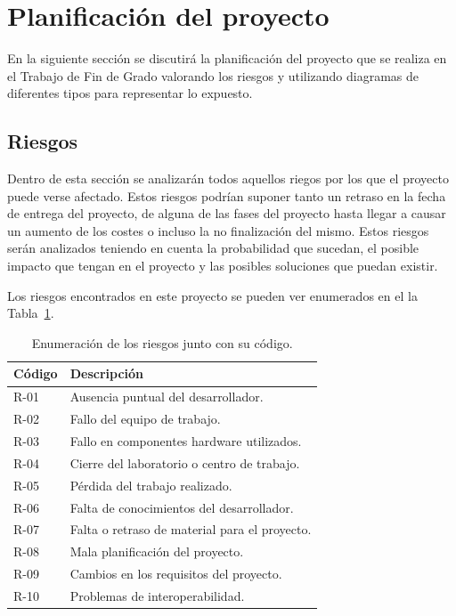 \section{Planificación del proyecto}

En la siguiente sección se discutirá la planificación del proyecto que se realiza en el Trabajo de Fin de Grado valorando los riesgos y utilizando diagramas de diferentes tipos para representar lo expuesto.

\subsection{Riesgos}%
\label{sec:riesgos}

Dentro de esta sección se analizarán  todos aquellos riegos por los que el proyecto puede verse afectado. Estos riesgos podrían suponer tanto un retraso en la fecha de entrega del proyecto, de alguna de las fases del proyecto hasta llegar a causar un aumento de los costes o incluso la no finalización del mismo. Estos riesgos serán analizados teniendo en cuenta la probabilidad que sucedan, el posible impacto que tengan en el proyecto y las posibles soluciones que puedan existir.

Los riesgos encontrados en este proyecto se pueden ver enumerados en el la Tabla~\ref{tabla:riesgos}. 

\begin{table}[htbp]
\begin{center}
\begin{tabular}{|l|l|}
\hline
\textbf{Código} & \textbf{Descripción} \\
\hline \hline
R-01 & Ausencia puntual del desarrollador. \\ \hline
R-02 & Fallo del equipo de trabajo. \\ \hline
R-03 & Fallo en componentes hardware utilizados. \\ \hline
R-04 & Cierre del laboratorio o centro de trabajo. \\ \hline
R-05 & Pérdida del trabajo realizado. \\ \hline
R-06 & Falta de conocimientos del desarrollador. \\ \hline
R-07 & Falta o retraso de material para el proyecto. \\ \hline
R-08 & Mala planificación del proyecto. \\ \hline
R-09 & Cambios en los requisitos del proyecto. \\ \hline
R-10 & Problemas de interoperabilidad. \\ \hline
\end{tabular}
\caption[Riesgos del sistema]{Enumeración de los riesgos junto con su código.}
\label{tabla:riesgos}
\end{center}
\end{table}

